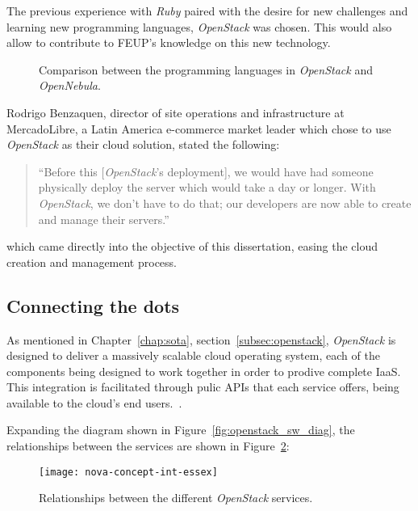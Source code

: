 The previous experience with \textit{Ruby} paired with the desire for new challenges and learning new programming languages, \textit{OpenStack} was chosen. This would also allow to contribute to FEUP's knowledge on this new technology.

\begin{figure}[h!]
  \begin{center}
    \leavevmode
    \caption{Comparison between the programming languages in \textit{OpenStack} and \textit{OpenNebula}.~\cite{ohloh}}
    \label{fig:code-stack-nebula}
  \end{center}
\end{figure}

Rodrigo Benzaquen, director of site operations and infrastructure at MercadoLibre, a Latin America e-commerce market leader which chose to use \textit{OpenStack} as their cloud solution, stated the following:

\begin{quote}
 ``Before this [\textit{OpenStack}'s deployment], we would have had someone physically deploy the server which would take a day or longer. With \textit{OpenStack}, we don't have to do that; our developers are now able to create and manage their servers.''\cite{openstack-userstories}
\end{quote}

which came directly into the objective of this dissertation, easing the cloud creation and management process.

\clearpage
\subsection{Connecting the dots}\label{subsec:architecture}

As mentioned in Chapter~\ref{chap:sota}, section~\ref{subsec:openstack}, \textit{OpenStack} is designed to deliver a massively scalable cloud operating system, each of the components being designed to work together in order to prodive complete IaaS. This integration is facilitated through pulic APIs that each service offers, being available to the cloud's end users.~\cite{ken-pepple:essex-arch}. 

Expanding the diagram shown in Figure~\ref{fig:openstack_sw_diag}, the relationships between the services are shown in Figure~\ref{fig:openstack_services}:

\begin{figure}[h!]
  \begin{center}
    \leavevmode
    \texttt{[image: nova-concept-int-essex]}
    \caption{Relationships between the different \textit{OpenStack} services.~\cite{ken-pepple:essex-arch}}
    \label{fig:openstack_services}
  \end{center}
\end{figure}

